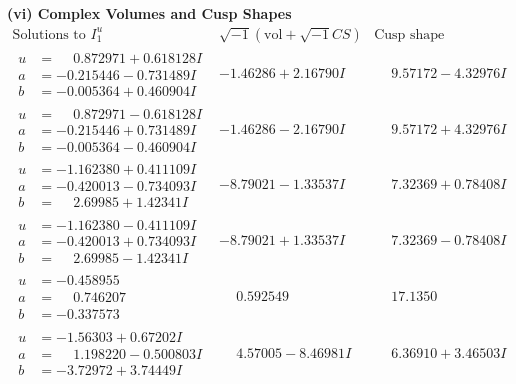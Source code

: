 \documentclass[1p]{elsarticle_modified}
\theoremstyle{definition}
\newcommand{\I}{\sqrt{-1}}
\begin{document}
\newpage\flushleft \textbf{(vi) Complex Volumes and Cusp Shapes}
$$\begin{array}{c|c|c}  
\text{Solutions to }I^u_{1}& \I (\text{vol} + \sqrt{-1}CS) & \text{Cusp shape}\\
 \hline 
\begin{aligned}
u &= \phantom{-}0.872971 + 0.618128 I \\
a &= -0.215446 - 0.731489 I \\
b &= -0.005364 + 0.460904 I\end{aligned}
 & -1.46286 + 2.16790 I & \phantom{-}9.57172 - 4.32976 I \\ \hline\begin{aligned}
u &= \phantom{-}0.872971 - 0.618128 I \\
a &= -0.215446 + 0.731489 I \\
b &= -0.005364 - 0.460904 I\end{aligned}
 & -1.46286 - 2.16790 I & \phantom{-}9.57172 + 4.32976 I \\ \hline\begin{aligned}
u &= -1.162380 + 0.411109 I \\
a &= -0.420013 - 0.734093 I \\
b &= \phantom{-}2.69985 + 1.42341 I\end{aligned}
 & -8.79021 - 1.33537 I & \phantom{-}7.32369 + 0.78408 I \\ \hline\begin{aligned}
u &= -1.162380 - 0.411109 I \\
a &= -0.420013 + 0.734093 I \\
b &= \phantom{-}2.69985 - 1.42341 I\end{aligned}
 & -8.79021 + 1.33537 I & \phantom{-}7.32369 - 0.78408 I \\ \hline\begin{aligned}
u &= -0.458955\phantom{ +0.000000I} \\
a &= \phantom{-}0.746207\phantom{ +0.000000I} \\
b &= -0.337573\phantom{ +0.000000I}\end{aligned}
 & \phantom{-}0.592549\phantom{ +0.000000I} & \phantom{-}17.1350\phantom{ +0.000000I} \\ \hline\begin{aligned}
u &= -1.56303 + 0.67202 I \\
a &= \phantom{-}1.198220 - 0.500803 I \\
b &= -3.72972 + 3.74449 I\end{aligned}
 & \phantom{-}4.57005 - 8.46981 I & \phantom{-}6.36910 + 3.46503 I \\ \hline\begin{aligned}

\end{aligned}
\end{array}$$
\end{document}
